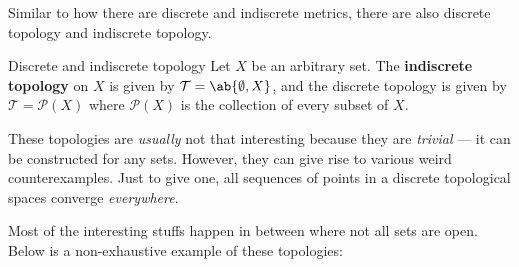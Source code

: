 Similar to how there are discrete and indiscrete metrics, there are also discrete
topology and indiscrete topology.

\begin{exmp}{Discrete and indiscrete topology}{}
  Let \(X\) be an arbitrary set. The \textbf{indiscrete topology} on \(X\) is given
  by \(\mathcal{T} = \ab\{\emptyset, X\}\), and the discrete topology is given by
  \(\mathcal{T} = \mathcal{P}(X)\) where \(\mathcal{P}(X)\) is the collection of every
  subset of \(X\).
\end{exmp}

These topologies are \emph{usually} not that interesting because they are \emph{trivial} ---
it can be constructed for any sets. However, they can give rise to various weird
counterexamples. Just to give one, all sequences of points in a discrete topological
spaces converge \emph{everywhere}.

Most of the interesting stuffs happen in between where not all sets are open. Below is
a non-exhaustive example of these topologies:

